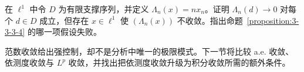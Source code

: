 \begin{exercise}[一致有界不可删]\label{exercise:3-3-3-4}
在 $\ell^1$ 中令 $D$ 为有限支撑序列，并定义
$\Lambda_n(x)=n x_n$。证明 $\Lambda_n(d)\to0$ 对每个 $d\in D$ 成立，但存在
$x\in\ell^1$ 使 $(\Lambda_n(x))$ 不收敛。指出命题~\ref{proposition:3-3-3-4} 的哪一项假设失败。
\end{exercise}

范数收敛给出强控制，却不是分析中唯一的极限模式。下一节将比较 a.e. 收敛、依测度收敛与
$L^p$ 收敛，并找出把依测度收敛升级为积分收敛所需的额外条件。
